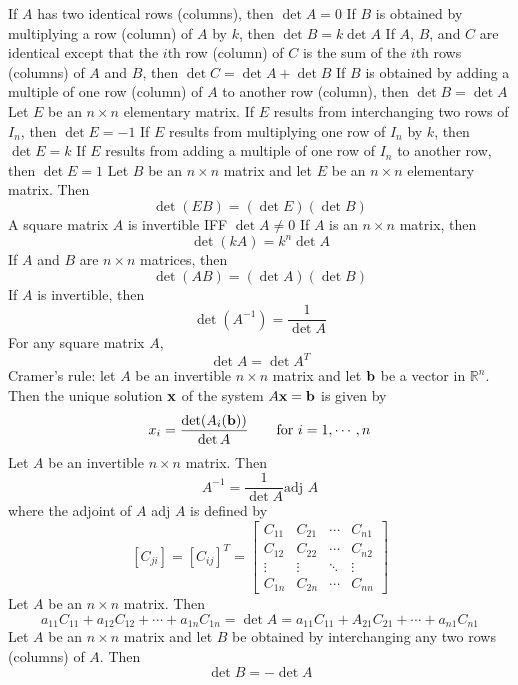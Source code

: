 \documentclass{article}
\begin{document}
\begin{outline}
            \2 If $A$ has two identical rows (columns), then \(\det A=0\)
            \2 If $B$ is obtained by multiplying a row (column) of $A$ by $k$, then \(\det B=k\det A\)
            \2 If $A$, $B$, and $C$ are identical except that the $i$th row (column) of $C$ is the sum of the $i$th rows (columns) of \(A\) and \(B\), then \(\det C=\det A+\det B\)
            \2 If $B$ is obtained by adding a multiple of one row (column) of $A$ to another row (column), then \(\det B=\det A\)
        \1 Let $E$ be an \(n\times n\) elementary matrix. 
            \2 If \(E\) results from interchanging two rows of $I_n$, then \(\det E=-1\)
            \2 If \(E\) results from multiplying one row of \(I_n\) by \(k\), then \(\det E=k\)
            \2 If \(E\) results from adding a multiple of one row of \(I_n\) to another row, then \(\det E=1\)
        \1 Let \(B\) be an \(n\times n\) matrix and let \(E\) be an \(n\times n\) elementary matrix. Then \[\det (EB)=(\det E)(\det B)\]
        \1 A square matrix \(A\) is invertible IFF \(\det A\neq 0\)
        \1 If \(A\) is an \(n\times n\) matrix, then \[\det (kA)=k^n\det A\]
        \1 If $A$ and $B$ are \(n\times n\) matrices, then \[\det (AB)=(\det A)(\det B)\]
        \1 If \(A\) is invertible, then \[\det (A^{-1})=\dfrac{1}{\det A}\]
        \1 For any square matrix $A$, \[\det A=\det A^T\]
        \1 Cramer's rule: let $A$ be an invertible \(n\times n\) matrix and let \(\vb b\) be a vector in \(\mathbb R^n\). Then the unique solution \(\vb x\) of the system \(A\vb x=\vb b\) is given by \[x_i=\dfrac{\det (A_i(\vb b))}{\det A}\qquad\text{for }i=1,\cdots,n\]
        \1 Let \(A\) be an invertible \(n\times n\) matrix. Then \[A^{-1}=\dfrac{1}{\det A}\text{adj }A\] where the adjoint of $A$ adj $A$ is defined by \[[C_{ji}]=[C_{ij}]^T=\begin{bmatrix}
            C_{11} & C_{21} & \cdots & C_{n1} \\ C_{12} & C_{22} & \cdots & C_{n2} \\ \vdots & \vdots & \ddots & \vdots \\ C_{1n} & C_{2n} & \cdots & C_{nn}
        \end{bmatrix}\]
        \1 Let $A$ be an \(n\times n\) matrix. Then \[a_{11}C_{11}+a_{12}C_{12}+\cdots+a_{1n}C_{1n}=\det A=a_{11}C_{11}+A_{21}C_{21}+\cdots+a_{n1}C_{n1}\]
        \1 Let $A$ be an \(n\times n\) matrix and let $B$ be obtained by interchanging any two rows (columns) of $A$. Then \[\det B=-\det A\]
    \end{outline}
    
\end{document}

